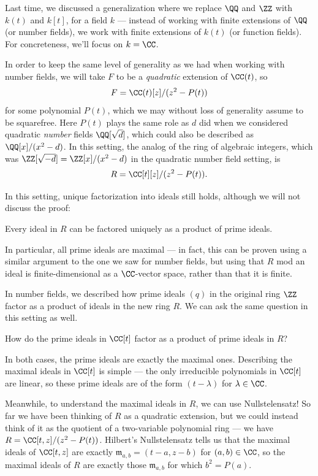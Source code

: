 Last time, we discussed a generalization where we replace $\QQ$ and $\ZZ$ with $k(t)$ and $k[t]$, for a field $k$ --- instead of working with finite extensions of $\QQ$ (or number fields), we work with finite extensions of $k(t)$ (or function fields). For concreteness, we'll focus on $k = \CC$. 

In order to keep the same level of generality as we had when working with number fields, we will take $F$ to be a \emph{quadratic} extension of $\CC(t)$, so \[F = \CC(t)[z]/(z^2 - P(t))\] for some polynomial $P(t)$, which we may without loss of generality assume to be squarefree. Here $P(t)$ plays the same role as $d$ did when we considered quadratic \emph{number} fields $\QQ[\sqrt{d}]$, which could also be described as $\QQ[x]/(x^2 - d)$. In this setting, the analog of the ring of algebraic integers, which was $\ZZ[\sqrt{-d}] = \ZZ[x]/(x^2 - d)$ in the quadratic number field setting, is \[R = \CC[t][z]/(z^2 - P(t)).\] 

In this setting, unique factorization into ideals still holds, although we will not discuss the proof:

\begin{theorem}
    Every ideal in $R$ can be factored uniquely as a product of prime ideals. 
\end{theorem}

In particular, all prime ideals are maximal --- in fact, this can be proven using a similar argument to the one we saw for number fields, but using that $R$ mod an ideal is finite-dimensional as a $\CC$-vector space, rather than that it is finite. 

In number fields, we described how prime ideals $(q)$ in the original ring $\ZZ$ factor as a product of ideals in the new ring $R$. We can ask the same question in this setting as well.

\begin{qq}
How do the prime ideals in $\CC[t]$ factor as a product of prime ideals in $R$?
\end{qq}

In both cases, the prime ideals are exactly the maximal ones. Describing the maximal ideals in $\CC[t]$ is simple --- the only irreducible polynomials in $\CC[t]$ are linear, so these prime ideals are of the form $(t - \lambda)$ for $\lambda \in \CC$. 

Meanwhile, to understand the maximal ideals in $R$, we can use Nullstelensatz! So far we have been thinking of $R$ as a quadratic extension, but we could instead think of it as the quotient of a two-variable polynomial ring --- we have $R = \CC[t, z]/(z^2 - P(t))$. Hilbert's Nullstelensatz tells us that the maximal ideals of $\CC[t, z]$ are exactly $\mathfrak{m}_{a, b} = (t - a, z - b)$ for $(a, b) \in \CC$, so the maximal ideals of $R$ are exactly those $\mathfrak{m}_{a, b}$ for which $b^2 = P(a)$. 

